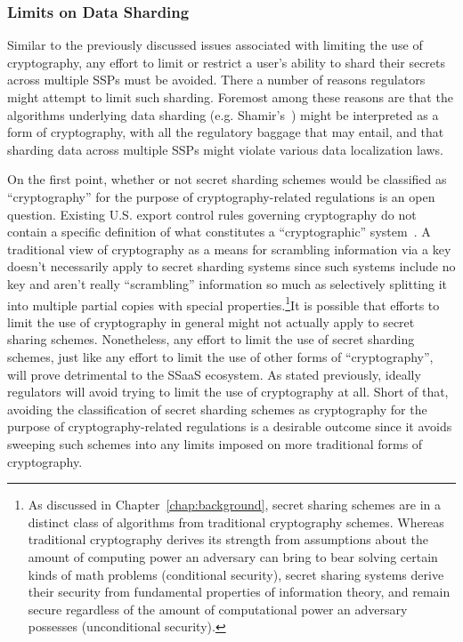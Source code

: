 \subsubsection{Limits on Data Sharding}

Similar to the previously discussed issues associated with limiting
the use of cryptography, any effort to limit or restrict a user's
ability to shard their secrets across multiple SSPs must be
avoided. There a number of reasons regulators might attempt to limit
such sharding. Foremost among these reasons are that the algorithms
underlying data sharding (e.g. Shamir's~\cite{shamir1979}) might be
interpreted as a form of cryptography, with all the regulatory baggage
that may entail, and that sharding data across multiple SSPs might
violate various data localization laws.

On the first point, whether or not secret sharding schemes would be
classified as ``cryptography'' for the purpose of cryptography-related
regulations is an open question. Existing U.S. export control rules
governing cryptography do not contain a specific definition of what
constitutes a ``cryptographic'' system~\cite{bis-encrypted}. A
traditional view of cryptography as a means for scrambling information
via a key doesn't necessarily apply to secret sharding systems since
such systems include no key and aren't really ``scrambling''
information so much as selectively splitting it into multiple partial
copies with special properties.\footnote{As discussed in
  Chapter~\ref{chap:background}, secret sharing schemes are in a
  distinct class of algorithms from traditional cryptography
  schemes. Whereas traditional cryptography derives its strength from
  assumptions about the amount of computing power an adversary can
  bring to bear solving certain kinds of math problems (conditional
  security), secret sharing systems derive their security from
  fundamental properties of information theory, and remain secure
  regardless of the amount of computational power an adversary
  possesses (unconditional security).}It is possible that efforts to
limit the use of cryptography in general might not actually apply to
secret sharing schemes. Nonetheless, any effort to limit the use of
secret sharding schemes, just like any effort to limit the use of
other forms of ``cryptography'', will prove detrimental to the SSaaS
ecosystem. As stated previously, ideally regulators will avoid trying
to limit the use of cryptography at all. Short of that, avoiding the
classification of secret sharding schemes as cryptography for the
purpose of cryptography-related regulations is a desirable outcome
since it avoids sweeping such schemes into any limits imposed on more
traditional forms of cryptography.

